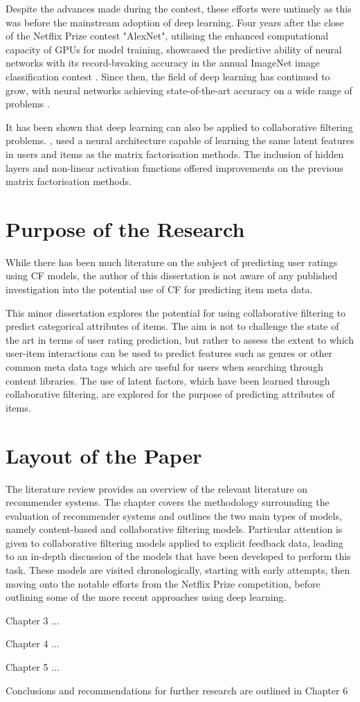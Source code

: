 Despite the advances made during the contest, these efforts were untimely as this was before the mainstream adoption of deep learning. Four years after the close of the Netflix Prize contest "AlexNet", utilising the enhanced computational capacity of GPUs for model training, showcased the predictive ability of neural networks with its record-breaking accuracy in the annual ImageNet image classification contest \parencite{krizhevsky2012imagenet}. Since then, the field of deep learning has continued to grow, with neural networks achieving state-of-the-art accuracy on a wide range of problems \parencite{alom2018history}.

It has been shown that deep learning can also be applied to collaborative filtering problems. \cite{he2017neural}, used a neural architecture capable of learning the same latent features in users and items as the matrix factorisation methods. The inclusion of hidden layers and non-linear activation functions offered improvements on the previous matrix factorisation methods.

\section{Purpose of the Research}
While there has been much literature on the subject of predicting user ratings using CF models, the author of this dissertation is not aware of any published investigation into the potential use of CF for predicting item meta data.

This minor dissertation explores the potential for using collaborative filtering to predict categorical attributes of items. The aim is not to challenge the state of the art in terms of user rating prediction, but rather to assess the extent to which user-item interactions can be used to predict features such as genres or other common meta data tags which are useful for users when searching through content libraries. The use of latent factors, which have been learned through collaborative filtering, are explored for the purpose of predicting attributes of items.

\section{Layout of the Paper}
The literature review provides an overview of the relevant literature on recommender systems. The chapter covers the methodology surrounding the evaluation of recommender systems and outlines the two main types of models, namely content-based and collaborative filtering models. Particular attention is given to collaborative filtering models applied to explicit feedback data, leading to an in-depth discussion of the models that have been developed to perform this task. These models are visited chronologically, starting with early attempts, then moving onto the notable efforts from the Netflix Prize competition, before outlining some of the more recent approaches using deep learning.

Chapter 3 ...

Chapter 4 ...

Chapter 5 ...

Conclusions and recommendations for further research are outlined in Chapter 6


 
